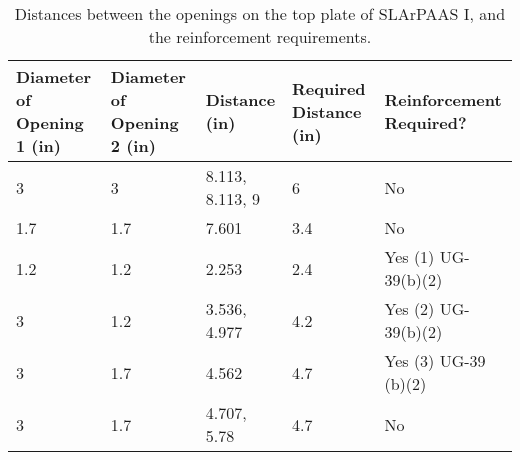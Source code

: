 \begin{table}[h]
\begin{center}
\tabcolsep=10pt
\begin{tabular}{m{2cm}|m{2cm}|l|m{2cm}|m{2.5cm}}
\hline
\hline
Diameter of Opening 1 (in) & 
Diameter of Opening 2 (in) & Distance (in) & 
Required Distance (in) & 
Reinforcement Required? \\
\hline
3 & 3 & 8.113, 8.113, 9 & 6 & No \\
1.7 & 1.7 & 7.601 & 3.4 & No \\
1.2 & 1.2 & 2.253 & 2.4 & Yes (1) UG-39(b)(2) \\
3 & 1.2 & 3.536, 4.977 & 4.2 & Yes (2) UG-39(b)(2) \\
3 & 1.7 & 4.562 & 4.7 & Yes (3) UG-39 (b)(2) \\
3 & 1.7 & 4.707, 5.78 & 4.7 & No \\
\hline
\hline
\end{tabular}
\caption{Distances between the openings on the top plate of
SLArPAAS I, and the reinforcement requirements.}
\label{table:opening_dist}
\end{center}
\end{table}
